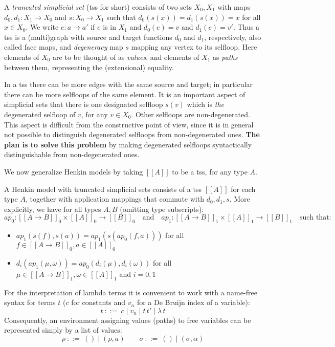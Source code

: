 \documentclass[10pt,a4paper]{article}
\newcommand{\sbr}[1]{[\![#1]\!]}
\newcommand{\vsbr}[1]{{[\![#1]\!]}_0}
\newcommand{\psbr}[1]{{[\![#1]\!]}_1}
\begin{document}
A \emph{truncated simplicial set} (tss for short) consists of two sets
$X_0,X_1$ with maps $d_0,d_1 : X_1\to X_0$ and $s:X_0\to X_1$
such that $d_0(s(x)) = d_1(s(x)) = x$ for all $x\in X_0$. 
We write $e:a\to a'$ if $e$ is in $X_1$ and $d_0(e) = v$ 
and $d_1(e) = v'$. Thus a tss is a (multi)graph with source and target
functions $d_0$ and $d_1$, respectively, also called face maps, and
\emph{degeneracy} map $s$ mapping any vertex to its selfloop.
Here elements of $X_0$ are to be thought of as \emph{values},
and elements of $X_1$ as \emph{paths} between them, representing
the (extensional) equality.

In a tss there can be more edges with the same source and target;
in particular there can be more selfloops of the same element.
It is an important aspect of simplicial sets that there is one
designated selfloop $s(v)$ which is \emph{the} degenerated selfloop of $v$,
for any $v\in X_0$. Other selfloops are non-degenerated.
This aspect is difficult from the constructive point of view,
since it is in general not possible to distinguish degenerated
selfloops from non-degenerated ones. {\bf The plan is to solve
this problem} by making degenerated selfloops
syntactically distinguishable from non-degenerated ones. 

We now generalize Henkin models by taking $\sbr{A}$ to be a tss, 
for any type $A$.

\begin{definition}
A Henkin model with truncated simplicial sets 
consists of a tss $\sbr{A}$ for each type $A$, 
together with application mappings that commute with $d_0,d_1,s$. 
More explicitly, we have for all types $A,B$ (omitting type subscripts):
\[ 
ap_0 :\vsbr{A\to B}\times\vsbr{A}\to\vsbr{B}
\quad\mbox{and}\quad
ap_1 :\psbr{A\to B}\times\psbr{A}\to\psbr{B}
\quad\mbox{such that:}
\]
\begin{itemize}
\item $ap_1(s(f),s(a))=ap_1(s(ap_0(f,a)))$ for all
$f\in\vsbr{A\to B},a\in\vsbr{A}$
\item $d_i(ap_1(\mu,\omega))=ap_0(d_i(\mu),d_i(\omega))$ for all
$\mu\in\psbr{A\to B},\omega\in\psbr{A}$ and $i{=}0,1$
\end{itemize}
\end{definition}


\medskip

For the interpretation of lambda terms it is convenient to work with 
a name-free syntax for terms $t$ ($c$ for constants and $v_n$ for a De Bruijn index of a variable):
\[
t~::=~ c \mid v_n \mid t\,t' \mid \lambda\,t
\]
Consequently, an environment assigning values (paths) to free variables
can be represented simply by a list of values: 
\[
\rho~::=~ () \mid (\rho,a)\quad\quad\sigma~::=~ () \mid (\sigma,\alpha)
\]
\end{document}
